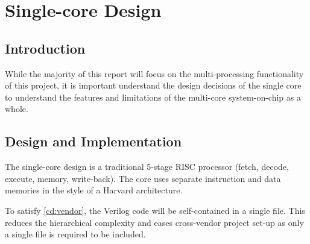 
\chapter{Single-core Design}
\label{sec:singlecore}
\startcontents[chapters]

\section{Introduction}
While the majority of this report will focus on the multi-processing functionality of this project, it is important understand the design decisions of the single core to understand the features and limitations of the multi-core system-on-chip as a whole.

\section{Design and Implementation}
The single-core design is a traditional 5-stage RISC processor (fetch, decode, execute, memory, write-back). The core uses separate instruction and data memories in the style of a Harvard architecture.

To satisfy \ref{cd:vendor}, the Verilog code will be self-contained in a single file. This reduces the hierarchical complexity and eases cross-vendor project set-up as only a single file is required to be included. 

